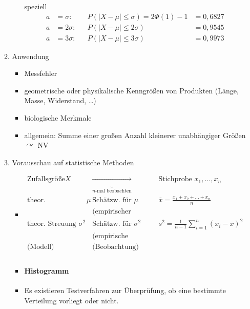 \documentclass[a4paper]{scrartcl}
\begin{document}
\begin{enumerate}
\begin{enumerate}
\begin{enumerate}
    speziell \\
    \begin{align*}
    a &= \sigma :& &P(\lvert X - \mu \rvert \leq \sigma) = 2 \Phi (1) -1 &= 0,6827 \\
     a &= 2 \sigma :& &P(\lvert X- \mu \rvert \leq 2 \sigma) &= 0,9545\\
     a &= 3 \sigma :& &P(\lvert X - \mu \rvert \leq 3 \sigma) &= 0,9973
    \end{align*}
    \end{enumerate}
    \item Anwendung
        \begin{itemize}
        \item Messfehler
        \item geometrische oder physikalische Kenngrößen von Produkten (Länge, Masse, Widerstand, \dots)
        \item biologische Merkmale
        \item allgemein: Summe einer großen Anzahl kleinerer unabhängiger Größen $\curvearrowright$ NV
        \end{itemize}
        
    \item Vorausschau auf statistische Methoden
        \begin{itemize}
        \item $\begin{array}{l|cl} \text{Zufallsgröße} X  & \underbrace{\rightarrow}_{n\text{-mal beobachten}} & \text{Stichprobe }  x_1,\dots,x_n \\
        \text{theor. Erwartungsw } \mu & \text{Schätzw. für } \mu & \bar{x} = \frac{x_1+x_2+\dots+x_n}{n} \\
        & \text{(empirischer Erw.wert)} & \\
        \text{theor. Streuung } \sigma^2 & \text{Schätzw. für } \sigma^2 & s^2 = \frac{1}{n-1} \sum\limits_{i=1}^n ( x_i - \bar{x})^2 \\
         & \text{(empirische Streuung)} & \\
        \text{(Modell)} & \text{(Beobachtung)} & \\
         \end{array}$
         \item \paragraph{Histogramm} \item Es existieren Testverfahren zur Überprüfung, ob eine bestimmte Verteilung vorliegt oder nicht.
         

\end{itemize}
\end{enumerate}
\end{enumerate}
\end{document}
